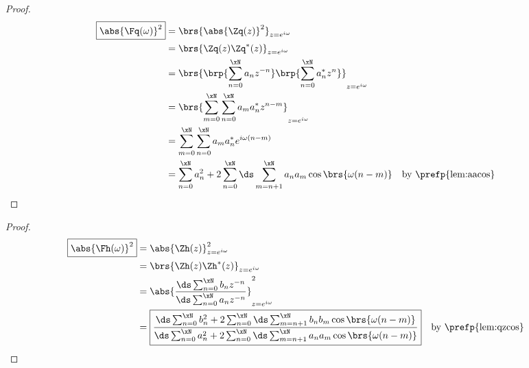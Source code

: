 \begin{lemma}
\label{lem:qzcos}
\end{lemma}
\begin{proof}
\begin{align*}
  \boxed{\abs{\Fq(\omega)}^2}
    &= \brs{\abs{\Zq(z)}^2}_{z=e^{i\omega}}
  \\&= \brs{\Zq(z)\Zq^\ast(z)}_{z=e^{i\omega}}
  \\&= \brs{\brp{\sum_{n=0}^{\xN} a_n      z^{-n}}
            \brp{\sum_{n=0}^{\xN} a_n^\ast z^{ n}}}_{z=e^{i\omega}}
  \\&= \brs{\sum_{m=0}^{\xN}\sum_{n=0}^{\xN} a_m a_n^\ast z^{n-m}}_{z=e^{i\omega}}
  \\&= \sum_{m=0}^{\xN}\sum_{n=0}^{\xN} a_m a_n^\ast e^{i\omega(n-m)}
  \\&= \sum_{n=0}^{\xN}a_n^2 + 2\sum_{n=0}^{\xN}\ds\sum_{m=n+1}^{\xN} a_n a_m \cos\brs{\omega(n-m)}
    && \text{by \prefp{lem:aacos}}
\end{align*}
\end{proof}

\begin{theorem}
\end{theorem}
\begin{proof}
\begin{align*}
  \boxed{\abs{\Fh(\omega)}^2}
    &= \abs{\Zh(z)}^2_{z=e^{i\omega}}
  \\&= \brs{\Zh(z)\Zh^\ast(z)}_{z=e^{i\omega}}
  \\&= \abs{\frac{\ds\sum_{n=0}^{\xN}b_n z^{-n}}{\ds\sum_{n=0}^{\xN}a_n z^{-n}}}^2_{z=e^{i\omega}}  
  \\&=\boxed{\frac{\ds\sum_{n=0}^{\xN}b_n^2 + 2\sum_{n=0}^{\xN}\ds\sum_{m=n+1}^{\xN} b_n b_m \cos\brs{\omega(n-m)}}
                  {\ds\sum_{n=0}^{\xN}a_n^2 + 2\sum_{n=0}^{\xN}\ds\sum_{m=n+1}^{\xN} a_n a_m \cos\brs{\omega(n-m)}}}
    && \text{by \prefp{lem:qzcos}}
\end{align*}
\end{proof}


